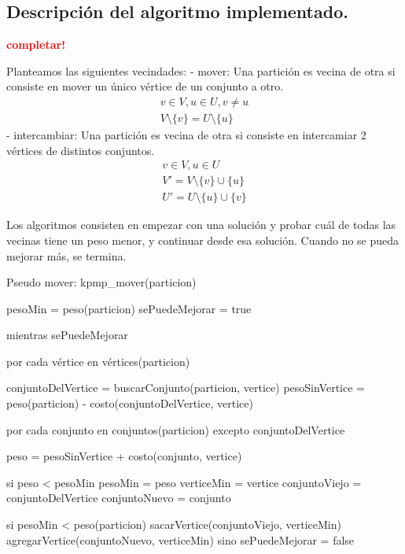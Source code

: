 \subsection{Descripción del algoritmo implementado.}
\vspace*{0.3cm}
\textcolor{red}{\textbf{completar!}}

Planteamos las siguientes vecindades:
- mover: Una partición es vecina de otra si consiste en mover un único vértice de un conjunto a otro.
\begin{align*}
  v \in V, u \in U, v \ne u \\
  V \setminus \{v\} = U \setminus \{u\}
\end{align*}
- intercambiar: Una partición es vecina de otra si consiste en intercamiar 2 vértices de distintos conjuntos.
\begin{align*}
  v \in V, u \in U \\
  V' = V \setminus \{v\} \cup \{u\} \\
  U' = U \setminus \{u\} \cup \{v\}
\end{align*}

Los algoritmos consisten en empezar con una solución y probar cuál de todas las
vecinas tiene un peso menor, y continuar desde esa solución. Cuando no se pueda
mejorar más, se termina.

Pseudo mover:
kpmp\_mover(particion) {
	pesoMin = peso(particion)
	sePuedeMejorar = true

	mientras sePuedeMejorar {
		por cada vértice en vértices(particion) {
			conjuntoDelVertice = buscarConjunto(particion, vertice)
			pesoSinVertice = peso(particion) - costo(conjuntoDelVertice, vertice)

			por cada conjunto en conjuntos(particion) excepto conjuntoDelVertice {
				peso = pesoSinVertice + costo(conjunto, vertice)

				si peso < pesoMin {
					pesoMin = peso
					verticeMin = vertice
					conjuntoViejo = conjuntoDelVertice
					conjuntoNuevo = conjunto
				}
			}
		}

		si pesoMin < peso(particion) {
			sacarVertice(conjuntoViejo, verticeMin)
			agregarVertice(conjuntoNuevo, verticeMin)
		} sino {
			sePuedeMejorar = false
		}
	}
}

